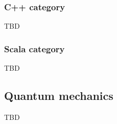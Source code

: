 \subsubsection{\textbf{C++} category}
TBD

\subsubsection{\textbf{Scala} category}
TBD

\subsection{Quantum mechanics}
TBD
